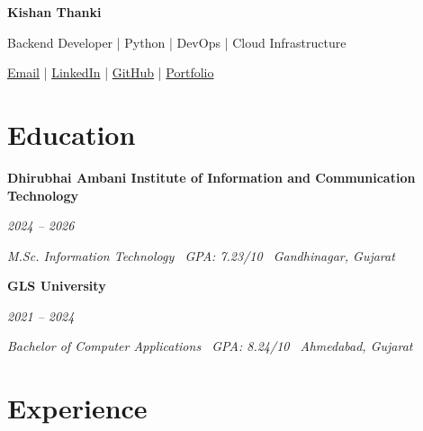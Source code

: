 \documentclass[10pt,a4paper]{article}
\newcommand{\datedentry}[2]{%
    \noindent
    \begin{minipage}[t]{0.72\linewidth}
        \raggedright
        \textbf{#1}
    \end{minipage}%
    \hfill
    \begin{minipage}[t]{0.25\linewidth}
        \raggedleft
        \textit{\color{textgray}#2}
    \end{minipage}%
    \par
}
\begin{document}
\begin{center}
    {\fontsize{24}{28}\selectfont
    \bfseries\color{accent} Kishan Thanki}
    \par\vspace{1.5pt}
    {\fontsize{10.5}{13}\selectfont
    \color{textgray}
    Backend Developer | Python | DevOps | Cloud Infrastructure}
    \par\vspace{2.5pt}
    {\fontsize{10}{12}\selectfont
    \href{mailto:kishanthankiat10@gmail.com}{Email}
    \quad|\quad
    \href{https://www.linkedin.com/in/kishanthanki8}{LinkedIn}
    \quad|\quad
    \href{https://github.com/kishan-thanki}{GitHub}
    \quad|\quad
    \href{https://kishan-thanki.github.io/kishanthanki/}{Portfolio}
    }
\end{center}

\section*{Education}

\datedentry
    {Dhirubhai Ambani Institute of Information and Communication Technology}
    {2024 -- 2026}
\vspace{1.5pt}
{\fontsize{10}{12}\selectfont
\itshape\color{textgray}
M.Sc. Information Technology
\textperiodcentered\ GPA: 7.23/10
\textperiodcentered\ Gandhinagar, Gujarat
}

\vspace{4pt}

\datedentry
    {GLS University}
    {2021 -- 2024}
\vspace{1.5pt}
{\fontsize{10}{12}\selectfont
\itshape\color{textgray}
Bachelor of Computer Applications
\textperiodcentered\ GPA: 8.24/10
\textperiodcentered\ Ahmedabad, Gujarat
}

\section*{Experience}
\end{document}
